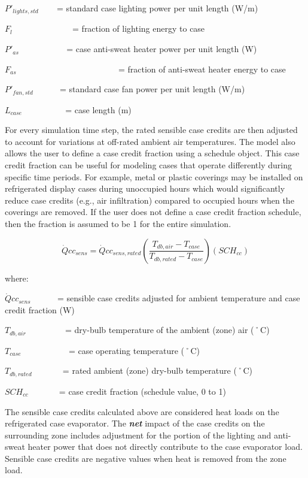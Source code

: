 \({P'}_{lights,std}\) ~~~ = standard case lighting power per unit length (W/m)

\({F_l}\) ~~~~~~~~~~~~~ = fraction of lighting energy to case

\({P'}_{as}\) ~~~~~~~~~~ = case anti-sweat heater power per unit length (W)

\({F_{as}}\) ~~~~~~~~~~~~~~~~~~~~~~~ = fraction of anti-sweat heater energy to case

\({P'}_{fan,std}\) ~~~~~ = standard case fan power per unit length (W/m)

\({L_{case}}\) ~~~~~~~~~ = case length (m)

For every simulation time step, the rated sensible case credits are then adjusted to account for variations at off-rated ambient air temperatures. The model also allows the user to define a case credit fraction using a schedule object. This case credit fraction can be useful for modeling cases that operate differently during specific time periods. For example, metal or plastic coverings may be installed on refrigerated display cases during unoccupied hours which would significantly reduce case credits (e.g., air infiltration) compared to occupied hours when the coverings are removed. If the user does not define a case credit fraction schedule, then the fraction is assumed to be 1 for the entire simulation.

\begin{equation}
\dot Qc{c_{sens}} = \dot Qc{c_{sens,rated}}\left( {\frac{{{T_{db,air}} - {T_{case}}}}{{{T_{db,rated}} - {T_{case}}}}} \right)\left( {SC{H_{cc}}} \right)
\end{equation}

where:

\(\dot Qc{c_{sens}}\) ~~~~~ = sensible case credits adjusted for ambient temperature and case credit fraction (W)

\({T_{db,air}}\) ~~~~~~~~ = dry-bulb temperature of the ambient (zone) air (˚C)

\({T_{case}}\) ~~~~~~~~~~ = case operating temperature (˚C)

\({T_{db,rated}}\) ~~~~~~ = rated ambient (zone) dry-bulb temperature (˚C)

\(SC{H_{cc}}\) ~~~~~~ = case credit fraction (schedule value, 0 to 1)

The sensible case credits calculated above are considered heat loads on the refrigerated case evaporator. The \textbf{\emph{net}} impact of the case credits on the surrounding zone includes adjustment for the portion of the lighting and anti-sweat heater power that does not directly contribute to the case evaporator load. Sensible case credits are negative values when heat is removed from the zone load.

